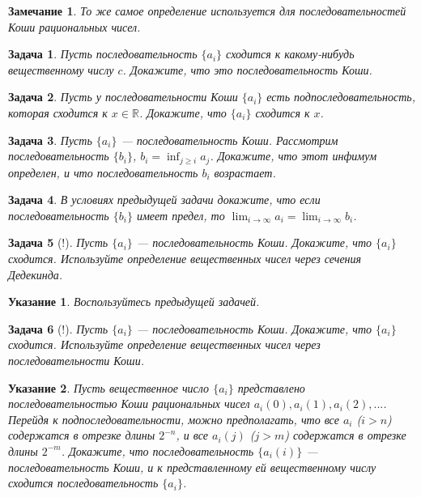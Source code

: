 \documentclass[12pt]{book}
\def\R{{\mathbb R}}
\theoremstyle{upshape}
\newtheorem{zadacha}{Задача}[chapter]
\theoremstyle{generic}
\theoremstyle{upshapenonumber}
\newtheorem{ukazanie}{Указание}[section]
\newtheorem{zamechanie}{Замечание}[chapter]
\newcommand{\следствие}{%
     \refstepcounter{teorema}
     {\noindent\bf Следствие \thechapter.\arabic{teorema}:\ }}
\newcommand{\пример}{%
     \refstepcounter{teorema}
     {\noindent\bf Пример \thechapter.\arabic{teorema}:\ }}
\newcommand{\лемма}{%
     \refstepcounter{teorema}
     {\noindent\bf Лемма \thechapter.\arabic{teorema}:\ }}
\newcommand{\теорема}{%
     \refstepcounter{teorema}
     {\noindent\bf Теорема \thechapter.\arabic{teorema}:\ }}
\newcommand{\утверждение}{%
     \refstepcounter{teorema}
     {\noindent\bf Утверждение \thechapter.\arabic{teorema}:\ }}
\begin{document}
\begin{zamechanie} То же самое определение используется для
последовательностей Коши рациональных чисел.
\end{zamechanie}

\begin{zadacha} Пусть последовательность $\{a_i\}$ сходится к
какому-нибудь вещественному числу $c$. Докажите, что это
последовательность Коши.
\end{zadacha}

\begin{zadacha} Пусть у последовательности Коши $\{a_i\}$ 
есть подпоследовательность, которая сходится к $x\in \R$. Докажите,
что $\{a_i\}$ сходится к $x$.
\end{zadacha}

\begin{zadacha} Пусть $\{a_i\}$ --- последовательность Коши.
Рассмотрим последовательность $\{b_i\}$, $b_i = \inf_{j\geq i}
a_j$. Докажите, что этот инфимум определен, и что последовательность
$b_i$ возрастает.
\end{zadacha}

\begin{zadacha} В условиях предыдущей задачи докажите, что если
последовательность $\{b_i\}$ имеет предел, то $\lim_{i \to \infty}
a_i =\lim_{i \to \infty} b_i$.
\end{zadacha}

\begin{zadacha}[!] Пусть $\{a_i\}$ --- последовательность
Коши. Докажите, что $\{a_i\}$ сходится. Используйте определение
вещественных чисел через сечения Дедекинда.
\end{zadacha}

\begin{ukazanie} Воспользуйтесь предыдущей задачей.
\end{ukazanie}

\begin{zadacha}[!] Пусть $\{a_i\}$ --- последовательность
Коши. Докажите, что $\{a_i\}$ сходится. Используйте определение
вещественных чисел через последовательности Коши.
\end{zadacha}

\begin{ukazanie} 
Пусть вещественное число $\{a_i\}$ представлено последовательностью
Коши рациональных чисел $a_i(0), a_i(1), a_i(2), ...$. Перейдя к
подпоследовательности, можно предполагать, что все $a_i$ ($i> n$)
содержатся в отрезке длины $2^{-n}$, и все $a_i(j)$
($j>m$)
содержатся в отрезке длины $2^{-m}$. Докажите, что
последовательность $\{a_i(i)\}$ --- последовательность Коши, и к
представленному ей вещественному числу сходится последовательность
$\{a_i\}$.
\end{ukazanie}
\end{document}
